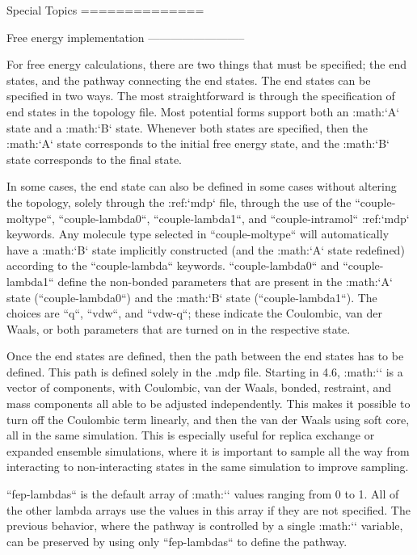 Special Topics
==============

Free energy implementation
--------------------------

For free energy calculations, there are two things that must be
specified; the end states, and the pathway connecting the end states.
The end states can be specified in two ways. The most straightforward is
through the specification of end states in the topology file. Most
potential forms support both an :math:`A` state and a :math:`B` state.
Whenever both states are specified, then the :math:`A` state corresponds
to the initial free energy state, and the :math:`B` state corresponds to
the final state.

In some cases, the end state can also be defined in some cases without
altering the topology, solely through the :ref:`mdp` file,
through the use of the
``couple-moltype``,
``couple-lambda0``,
``couple-lambda1``, and ``couple-intramol`` :ref:`mdp`
keywords. Any molecule type selected in ``couple-moltype``
will automatically have a :math:`B` state implicitly constructed (and
the :math:`A` state redefined) according to the
``couple-lambda`` keywords. ``couple-lambda0``
and ``couple-lambda1`` define the non-bonded parameters that
are present in the :math:`A` state (``couple-lambda0``) and
the :math:`B` state (``couple-lambda1``). The choices are
``q``,
``vdw``, and ``vdw-q``; these indicate the Coulombic, van der Waals, or
both parameters that are turned on in the respective state.

Once the end states are defined, then the path between the end states
has to be defined. This path is defined solely in the .mdp file.
Starting in 4.6, :math:`\lambda` is a vector of components, with
Coulombic, van der Waals, bonded, restraint, and mass components all
able to be adjusted independently. This makes it possible to turn off
the Coulombic term linearly, and then the van der Waals using soft core,
all in the same simulation. This is especially useful for replica
exchange or expanded ensemble simulations, where it is important to
sample all the way from interacting to non-interacting states in the
same simulation to improve sampling.

``fep-lambdas`` is the default array of :math:`\lambda`
values ranging from 0 to 1. All of the other lambda arrays use the
values in this array if they are not specified. The previous behavior,
where the pathway is controlled by a single :math:`\lambda` variable,
can be preserved by using only ``fep-lambdas`` to define the
pathway.

